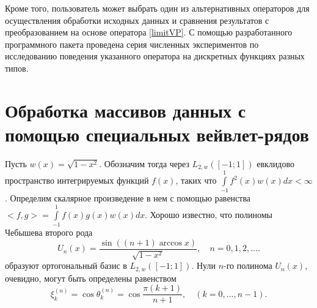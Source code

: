 Кроме того, пользователь может выбрать один из альтернативных операторов для осуществления обработки исходных данных и сравнения результатов с преобразованием на основе оператора \eqref{limitVP}.
С помощью разработанного программного пакета проведена серия численных экспериментов по исследованию поведения указанного оператора на дискретных функциях разных типов.










\section{Обработка массивов данных с помощью специальных вейвлет-рядов}


Пусть $w(x) = \sqrt{1-x^2}$. Обозначим тогда через $L_{2, w}([-1; 1])$ евклидово пространство интегрируемых функций $f(x)$, таких что
$\int\limits_{-1}^{1} f^2(x)w(x)dx < \infty$.
Определим скалярное произведение в нем с помощью равенства
$ <f, g> = \int\limits_{-1}^{1} f(x) g(x) w(x) dx$.
Хорошо известно, что полиномы Чебышева второго рода
 \begin{equation*}
\label{u2direct}
U_n(x) = \frac{\sin((n+1)\arccos{x})}{\sqrt{1-x^2}}, \quad n = 0,1,2, \ldots .
\end{equation*}
образуют ортогональный базис в $L_{2, w}([-1; 1])$.
Нули $n$-го полинома $U_n(x)$, очевидно, могут быть определены равенством
\begin{equation*}
\label{sms1zeros}
\xi_{k}^{(n)} = \cos{\theta_{k}^{(n)}} =  \cos{\frac{\pi (k+1)}{n+1}}, \quad (k = 0,...,n-1).
\end{equation*}

